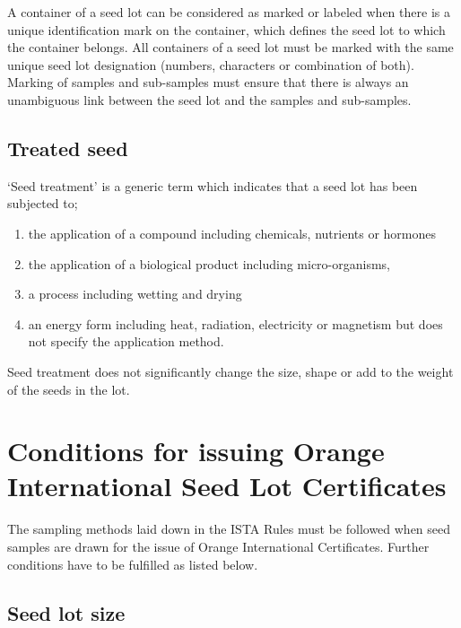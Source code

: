 \documentclass[
]{book}
\begin{document}
A container of a seed lot can be considered as marked or labeled when there is a unique identification mark on the container, which defines the seed lot to which the container belongs. All containers of a seed lot must be marked with the same unique seed lot designation (numbers, characters or combination of both). Marking of samples and sub-samples must ensure that there is always an unambiguous link between the seed lot and the samples and sub-samples.

\hypertarget{treated-seed}{%
\subsection{Treated seed}\label{treated-seed}}

`Seed treatment' is a generic term which indicates that a seed lot has been subjected to;

\begin{enumerate}
\def\labelenumi{\alph{enumi})}
\item
  the application of a compound including chemicals, nutrients or hormones
\item
  the application of a biological product including micro-organisms,
\item
  a process including wetting and drying
\item
  an energy form including heat, radiation, electricity or magnetism but does not specify the application method.
\end{enumerate}

Seed treatment does not significantly change the size, shape or add to the weight of the seeds in the lot.

\hypertarget{conditions-for-issuing-orange-international-seed-lot-certificates}{%
\section{Conditions for issuing Orange International Seed Lot Certificates}\label{conditions-for-issuing-orange-international-seed-lot-certificates}}

The sampling methods laid down in the ISTA Rules must be followed when seed samples are drawn for the issue of Orange International Certificates. Further conditions have to be fulfilled as listed below.

\hypertarget{seed-lot-size}{%
\subsection{Seed lot size}\label{seed-lot-size}}
\end{document}
